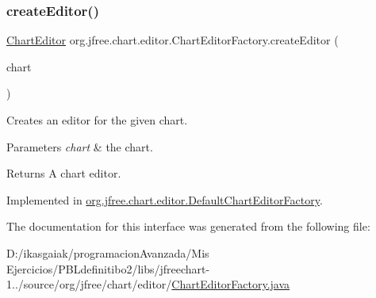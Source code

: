 \subsubsection{\texorpdfstring{create\+Editor()}{createEditor()}}
{\footnotesize\ttfamily \mbox{\hyperlink{interfaceorg_1_1jfree_1_1chart_1_1editor_1_1_chart_editor}{Chart\+Editor}} org.\+jfree.\+chart.\+editor.\+Chart\+Editor\+Factory.\+create\+Editor (\begin{DoxyParamCaption}\item[{\mbox{\hyperlink{classorg_1_1jfree_1_1chart_1_1_j_free_chart}{J\+Free\+Chart}}}]{chart }\end{DoxyParamCaption})}

Creates an editor for the given chart.


\begin{DoxyParams}{Parameters}
{\em chart} & the chart.\\
\hline
\end{DoxyParams}
\begin{DoxyReturn}{Returns}
A chart editor. 
\end{DoxyReturn}


Implemented in \mbox{\hyperlink{classorg_1_1jfree_1_1chart_1_1editor_1_1_default_chart_editor_factory_a60da8d3019f6cd965af30841d66689c4}{org.\+jfree.\+chart.\+editor.\+Default\+Chart\+Editor\+Factory}}.



The documentation for this interface was generated from the following file\+:\begin{DoxyCompactItemize}
\item 
D\+:/ikasgaiak/programacion\+Avanzada/\+Mis Ejercicios/\+P\+B\+Ldefinitibo2/libs/jfreechart-\/1../source/org/jfree/chart/editor/\mbox{\hyperlink{_chart_editor_factory_8java}{Chart\+Editor\+Factory.\+java}}\end{DoxyCompactItemize}
